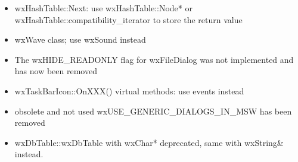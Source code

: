 \begin{itemize}
\item wxHashTable::Next: use wxHashTable::Node* or wxHashTable::compatibility\_iterator to store the return value
\item wxWave class; use wxSound instead
\item The wxHIDE\_READONLY flag for wxFileDialog was not implemented and has now been removed
\item wxTaskBarIcon::OnXXX() virtual methods: use events instead
\item obsolete and not used wxUSE\_GENERIC\_DIALOGS\_IN\_MSW has been removed
\item wxDbTable::wxDbTable with wxChar* deprecated, same with wxString\& instead.
\end{itemize}
